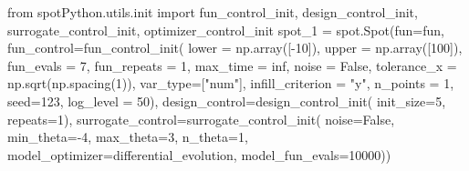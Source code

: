 \documentclass[
  letterpaper,
  DIV=11,
  numbers=noendperiod]{scrreprt}
\newenvironment{Shaded}{\begin{snugshade}}{\end{snugshade}}
\newcommand{\DecValTok}[1]{\textcolor[rgb]{0.68,0.00,0.00}{#1}}
\newcommand{\ImportTok}[1]{\textcolor[rgb]{0.00,0.46,0.62}{#1}}
\newcommand{\NormalTok}[1]{\textcolor[rgb]{0.00,0.23,0.31}{#1}}
\newcommand{\OperatorTok}[1]{\textcolor[rgb]{0.37,0.37,0.37}{#1}}
\newcommand{\StringTok}[1]{\textcolor[rgb]{0.13,0.47,0.30}{#1}}
\newcommand{\VariableTok}[1]{\textcolor[rgb]{0.07,0.07,0.07}{#1}}
\begin{document}
\begin{Shaded}
\begin{Highlighting}[]
\ImportTok{from}\NormalTok{ spotPython.utils.init }\ImportTok{import}\NormalTok{ fun\_control\_init, design\_control\_init, surrogate\_control\_init, optimizer\_control\_init}
\NormalTok{spot\_1 }\OperatorTok{=}\NormalTok{ spot.Spot(fun}\OperatorTok{=}\NormalTok{fun,}
\NormalTok{                   fun\_control}\OperatorTok{=}\NormalTok{fun\_control\_init(}
\NormalTok{                        lower }\OperatorTok{=}\NormalTok{ np.array([}\OperatorTok{{-}}\DecValTok{10}\NormalTok{]),}
\NormalTok{                        upper }\OperatorTok{=}\NormalTok{ np.array([}\DecValTok{100}\NormalTok{]),}
\NormalTok{                        fun\_evals }\OperatorTok{=} \DecValTok{7}\NormalTok{,}
\NormalTok{                        fun\_repeats }\OperatorTok{=} \DecValTok{1}\NormalTok{,}
\NormalTok{                        max\_time }\OperatorTok{=}\NormalTok{ inf,}
\NormalTok{                        noise }\OperatorTok{=} \VariableTok{False}\NormalTok{,}
\NormalTok{                        tolerance\_x }\OperatorTok{=}\NormalTok{ np.sqrt(np.spacing(}\DecValTok{1}\NormalTok{)),}
\NormalTok{                        var\_type}\OperatorTok{=}\NormalTok{[}\StringTok{"num"}\NormalTok{],}
\NormalTok{                        infill\_criterion }\OperatorTok{=} \StringTok{"y"}\NormalTok{,}
\NormalTok{                        n\_points }\OperatorTok{=} \DecValTok{1}\NormalTok{,}
\NormalTok{                        seed}\OperatorTok{=}\DecValTok{123}\NormalTok{,}
\NormalTok{                        log\_level }\OperatorTok{=} \DecValTok{50}\NormalTok{),}
\NormalTok{                   design\_control}\OperatorTok{=}\NormalTok{design\_control\_init(}
\NormalTok{                        init\_size}\OperatorTok{=}\DecValTok{5}\NormalTok{,}
\NormalTok{                        repeats}\OperatorTok{=}\DecValTok{1}\NormalTok{),}
\NormalTok{                   surrogate\_control}\OperatorTok{=}\NormalTok{surrogate\_control\_init(}
\NormalTok{                        noise}\OperatorTok{=}\VariableTok{False}\NormalTok{,}
\NormalTok{                        min\_theta}\OperatorTok{={-}}\DecValTok{4}\NormalTok{,}
\NormalTok{                        max\_theta}\OperatorTok{=}\DecValTok{3}\NormalTok{,}
\NormalTok{                        n\_theta}\OperatorTok{=}\DecValTok{1}\NormalTok{,}
\NormalTok{                        model\_optimizer}\OperatorTok{=}\NormalTok{differential\_evolution,}
\NormalTok{                        model\_fun\_evals}\OperatorTok{=}\DecValTok{10000}\NormalTok{))}
\end{Highlighting}
\end{Shaded}
\end{document}
